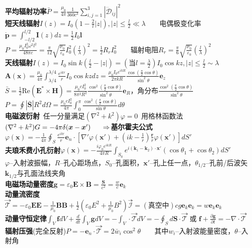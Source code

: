 \documentclass[10pt,a4paper]{article}
\begin{document}
\begin{multicols}{2}
\indent\textbf{平均辐射功率}$\bar{P}=\frac{\mu_0}{4\pi}\frac{1}{360c^3}\sum_{i,j=1}^3|\dddot{\bm{\mathcal{D}}}_{ij}|^2$\\
\textbf{短天线辐射}$I(z)=I_0(1-\frac{2}{l}|z|),|z|\leq\frac{l}{2}\ll\lambda$~~~~电偶极变化率$\dot{\bm{p}}=\int_{-l/2}^{l/2}\bm{I}(z)dz=\frac{1}{2}I_0\bm{l}$\\
$P=\frac{\mu_0I_0^2\omega^2l^2}{48\pi c}=\frac{\pi}{12}\sqrt{\frac{\mu_0}{\varepsilon_0}}I_0^2(\frac{l}{\lambda})^2=\frac{1}{2}R_rI_0^2$~~~~辐射电阻$R_r=\frac{\pi}{6}\sqrt{\frac{\mu_0}{\varepsilon_0}}(\frac{l}{\lambda})^2$\\
\textbf{天线辐射}$I(z)=I_0\sin k(\frac{l}{2}-|z|)=(\text{当}l=\frac{\lambda}{2})I_0\cos kz,|z|\leq\frac{l}{2}\sim\lambda$\\
$\bm{A}(\bm{x})=\frac{\mu_0}{4\pi}\int_{\lambda/4}^{\lambda/4}\frac{e^{ikr}}{r}I_0\cos kzdz=\frac{\mu_0I_0e^{ikR}}{2\pi kR}\frac{\cos(\frac{\pi}{2}\cos\theta)}{\sin^2\theta}\bm{e}_z$\\
$\bar{S}=\frac{1}{2}\text{Re}(\bm{E}^*\times\bm{H})=\frac{\mu_0cI_0^2}{8\pi^2R^2}\frac{\cos^2(\frac{\pi}{2}\cos\theta)}{\sin^2\theta}\bm{e}_R$，角分布$\frac{\cos^2(\frac{\pi}{2}\cos\theta)}{\sin^2\theta}$\\
$P=\oint|\bar{\bm{S}}|R^2d\Omega=\frac{\mu_0cI_0^2}{4\pi}\int_0^{\pi}\frac{\cos^2(\frac{\pi}{2}\cos\theta)}{\sin\theta}d\theta$\\
\textbf{电磁波衍射}~任一分量满足$(\nabla^2+k^2)\varphi=0$~用格林函数法$(\nabla^2+k^2)G=-4\pi\delta(\bm{x}-\bm{x}')\\
\indent\Rightarrow$\textbf{基尔霍夫公式}$\varphi(\bm{x})=-\frac{1}{4\pi}\oint_S\frac{e^{ikr}}{r}\bm{e}_n\cdot[\nabla'\varphi(\bm{x}')+(ik-\frac{1}{r})\frac{\bm{r}}{r}\varphi(\bm{x}')]dS'$\\
\textbf{夫琅禾费小孔衍射}$\varphi(\bm{x})=-\frac{i\varphi_0e^{ikR}}{4\pi R}\int_{S_0}e^{i(\bm{k}_1-\bm{k}_2)\cdot\bm{x}'}(\cos\theta_1+\cos\theta_2)dS'$\\
\indent{}$\varphi$--入射波振幅，$R$--孔心距场点，$S_0$--孔面积，$\bm{x}'$--孔上任一点，$\theta_{1/2}$--孔前/后波矢$\bm{k}_{1/2}$与孔面法线夹角\scriptsize\\
\textbf{电磁场动量密度}$\bm{g}=\varepsilon_0\bm{E}\times\bm{B}=\frac{\bm{S}}{c^2}=\frac{w}{c}\bm{e}_k$\\
\textbf{动量流密度}$\overset{\twoheadrightarrow}{\mathcal{T}}=-\varepsilon_0\bm{E}\bm{E}-\frac{1}{\mu_0}\bm{B}\bm{B}+\frac{1}{2}(\varepsilon_0E^2+\frac{1}{\mu_0}B^2)\overset{\twoheadrightarrow}{\mathcal{I}}=(\text{真空中})cg\bm{e}_{k}\bm{e}_{k}=w\bm{e}_k\bm{e}_k$\\
\textbf{动量守恒定律}$\int_V\bm{f}dV+\frac{d}{dt}\int_V\bm{g}dV=-\int_V\cdot\overset{\twoheadrightarrow}{\mathcal{T}}dV=-\oint_Sd\bm{S}\cdot\overset{\twoheadrightarrow}{\mathcal{T}}$ 或 $\bm{f}+\frac{\partial\bm{g}}{\partial t}=-\nabla\cdot\overset{\twoheadrightarrow}{\mathcal{T}}$\\
\textbf{辐射压强}(完全反射)$P=-\bm{e}_n\cdot\overset{\twoheadrightarrow}{\mathcal{T}}=2\bar{w}_i\cos^2\theta$~~~~其中$w_i$--入射波能量密度，$\theta$--入射角
\end{multicols}
\end{document}
